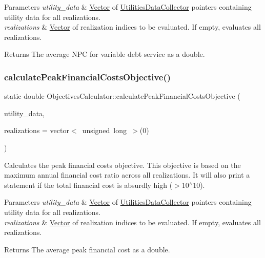 \begin{DoxyParams}{Parameters}
{\em utility\+\_\+data} & \mbox{\hyperlink{classVector}{Vector}} of {\ttfamily \mbox{\hyperlink{classUtilitiesDataCollector}{Utilities\+Data\+Collector}}} pointers containing utility data for all realizations. \\
\hline
{\em realizations} & \mbox{\hyperlink{classVector}{Vector}} of realization indices to be evaluated. If empty, evaluates all realizations. \\
\hline
\end{DoxyParams}
\begin{DoxyReturn}{Returns}
The average N\+PC for variable debt service as a double. 
\end{DoxyReturn}
\mbox{\label{classObjectivesCalculator_a3de288911848c40150918d04879bdacb}} 
\subsubsection{\texorpdfstring{calculate\+Peak\+Financial\+Costs\+Objective()}{calculatePeakFinancialCostsObjective()}}
{\footnotesize\ttfamily static double Objectives\+Calculator\+::calculate\+Peak\+Financial\+Costs\+Objective (\begin{DoxyParamCaption}\item[{const vector$<$ \mbox{\hyperlink{classUtilitiesDataCollector}{Utilities\+Data\+Collector}} $\ast$$>$ \&}]{utility\+\_\+data,  }\item[{vector$<$ unsigned long $>$}]{realizations = {\ttfamily vector$<$~unsigned~long~$>$(0)} }\end{DoxyParamCaption})\hspace{0.3cm}{\ttfamily [static]}}



Calculates the peak financial costs objective. This objective is based on the maximum annual financial cost ratio across all realizations. It will also print a statement if the total financial cost is absurdly high ($>$10$^\wedge$10). 


\begin{DoxyParams}{Parameters}
{\em utility\+\_\+data} & \mbox{\hyperlink{classVector}{Vector}} of {\ttfamily \mbox{\hyperlink{classUtilitiesDataCollector}{Utilities\+Data\+Collector}}} pointers containing utility data for all realizations. \\
\hline
{\em realizations} & \mbox{\hyperlink{classVector}{Vector}} of realization indices to be evaluated. If empty, evaluates all realizations.\\
\hline
\end{DoxyParams}
\begin{DoxyReturn}{Returns}
The average peak financial cost as a double.
\end{DoxyReturn}

